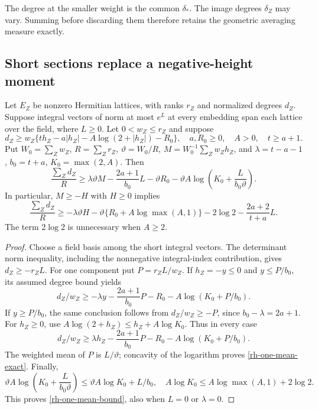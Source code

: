 The degree at the smaller weight is the common $\delta_*$. The
image degrees $\delta_Z$ may vary. Summing before discarding them
therefore retains the geometric averaging measure exactly.

\subsection{Short sections replace a negative-height moment}

\begin{proposition}
\label{rh-short-sections}
Let $E_Z$ be nonzero Hermitian lattices, with ranks $r_Z$ and
normalized degrees $d_Z$. Suppose integral vectors of norm at most
$e^L$ at every embedding span each lattice over the field, where
$L\ge0$. Let $0<w_Z\le r_Z$ and suppose
\[
 d_Z\ge w_Z\{t h_Z-a|h_Z|-A\log(2+|h_Z|)-R_0\},
 \quad a,R_0\ge0,\quad A>0,\quad t\ge a+1.
\]
Put $W_0=\sum_Zw_Z$, $R=\sum_Zr_Z$, $\vartheta=W_0/R$,
$M=W_0^{-1}\sum_Zw_Zh_Z$, and
$\lambda=t-a-1$, $b_0=t+a$, $K_0=\max(2,A)$. Then
\begin{equation}\label{rh-one-mean-exact}
 \frac{\sum_Zd_Z}{R}
 \ge\lambda\vartheta M-\frac{2a+1}{b_0}L-\vartheta R_0
       -\vartheta A\log\!\left(K_0+\frac{L}{b_0\vartheta}\right).
\end{equation}
In particular, $M\ge-H$ with $H\ge0$ implies
\begin{equation}\label{rh-one-mean-bound}
 \frac{\sum_Zd_Z}{R}
 \ge-\lambda\vartheta H-\vartheta\{R_0+A\log\max(A,1)\}
       -2\log2-\frac{2a+2}{t+a}L.
\end{equation}
The term $2\log2$ is unnecessary when $A\ge2$.
\end{proposition}

\begin{proof}
Choose a field basis among the short integral vectors. The determinant
norm inequality, including the nonnegative integral-index contribution,
gives $d_Z\ge-r_ZL$.
For one component put $P=r_ZL/w_Z$. If $h_Z=-y\le0$ and
$y\le P/b_0$, its assumed degree bound yields
\[
 d_Z/w_Z\ge-\lambda y-\frac{2a+1}{b_0}P
                           -R_0-A\log(K_0+P/b_0).
\]
If $y\ge P/b_0$, the same conclusion follows from $d_Z/w_Z\ge-P$,
since $b_0-\lambda=2a+1$. For $h_Z\ge0$, use
$A\log(2+h_Z)\le h_Z+A\log K_0$. Thus in every case
\[
 d_Z/w_Z\ge\lambda h_Z-\frac{2a+1}{b_0}P
                           -R_0-A\log(K_0+P/b_0).
\]
The weighted mean of $P$ is $L/\vartheta$; concavity of the logarithm
proves \eqref{rh-one-mean-exact}. Finally,
\[
 \vartheta A\log\!\left(K_0+\frac{L}{b_0\vartheta}\right)
 \le\vartheta A\log K_0+L/b_0,
 \quad A\log K_0\le A\log\max(A,1)+2\log2.
\]
This proves \eqref{rh-one-mean-bound}, also when $L=0$ or $\lambda=0$.
\end{proof}

